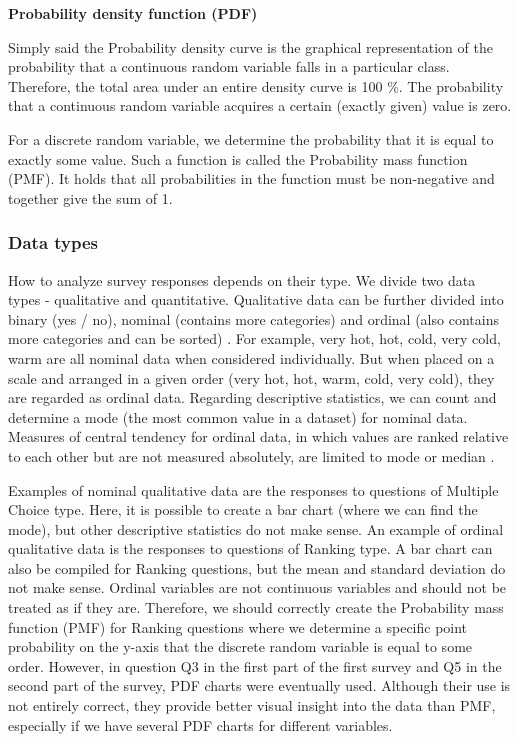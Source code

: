 \documentclass[a4paper,10pt,twoside]{article}
\begin{document}
\bigskip
\noindent \textbf {Probability density function (PDF)}

\noindent Simply said the Probability density curve is the graphical
representation of the probability that a continuous random variable
falls in a particular class. Therefore, the total area under an entire
density curve is 100 \%. The probability that a continuous random
variable acquires a certain (exactly given) value is zero.

For a discrete random variable, we determine the probability that it
is equal to exactly some value. Such a function is called the
Probability mass function (PMF). It holds that all probabilities in
the function must be non-negative and together give the sum of 1.

\newpage
\vspace*{-1cm}
\subsubsection{Data types}

How to analyze survey responses depends on their type. We divide two
data types - qualitative and quantitative. Qualitative data can be
further divided into binary (yes / no), nominal (contains more
categories) and ordinal (also contains more categories and can be
sorted) \cite{minitab}. For example, very hot, hot, cold, very cold,
warm are all nominal data when considered individually. But when
placed on a scale and arranged in a given order (very hot, hot, warm,
cold, very cold), they are regarded as ordinal data. Regarding
descriptive statistics, we can count and determine a mode (the most
common value in a dataset) for nominal data. Measures of central
tendency for ordinal data, in which values are ranked relative to each
other but are not measured absolutely, are limited to mode or median
\cite{ordinaldata}.

Examples of nominal qualitative data are the responses to questions of
Multiple Choice type. Here, it is possible to create a bar chart
(where we can find the mode), but other descriptive statistics do not
make sense. An example of ordinal qualitative data is the responses to
questions of Ranking type. A bar chart can also be compiled for
Ranking questions, but the mean and standard deviation do not make
sense. Ordinal variables are not continuous variables and should not
be treated as if they are. Therefore, we should correctly create the
Probability mass function (PMF) for Ranking questions where we
determine a specific point probability on the y-axis that the discrete
random variable is equal to some order. However, in question Q3 in the
first part of the first survey and Q5 in the second part of the
survey, PDF charts were eventually used. Although their use is not
entirely correct, they provide better visual insight into the data
than PMF, especially if we have several PDF charts for different
variables.
\end{document}
